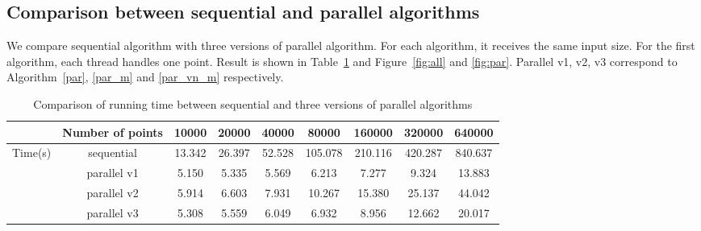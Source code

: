 \subsection{Comparison between sequential and parallel algorithms}
We compare sequential algorithm with three versions of parallel algorithm. For each algorithm, it
receives the same input size. For the first algorithm, each thread handles one point. Result is shown in
Table~\ref{tab:comparison} and Figure~\ref{fig:all} and \ref{fig:par}. Parallel v1, v2, v3 correspond to
Algorithm~\ref{par}, \ref{par_m} and \ref{par_vn_m} respectively.   
\begin{table}[!h]
  \centering
  \begin{tabular}{|c|c|c|c|c|c|c|c|c|}
    \hline
    {}& Number of points	& 10000	& 20000	& 40000	& 80000	& 160000	& 320000	& 640000 \\
    \hline
    \multirow{4}{*}{Time(s)}	& sequential	& 13.342	& 26.397	& 52.528	& 105.078	& 210.116	& 420.287	& 840.637 \\
    \cline{2-9}
	  & parallel v1	& 5.150	& 5.335	& 5.569	& 6.213	& 7.277	& 9.324	& 13.883 \\
    \cline{2-9}
	  & parallel v2	& 5.914	& 6.603	& 7.931	& 10.267	& 15.380	& 25.137	& 44.042 \\
    \cline{2-9}
	  & parallel v3	& 5.308	& 5.559	& 6.049	& 6.932	& 8.956	& 12.662	& 20.017 \\
    \hline
  \end{tabular}
  \label{tab:comparison}
  \caption{Comparison of running time between sequential and three versions of parallel algorithms}
\end{table}

